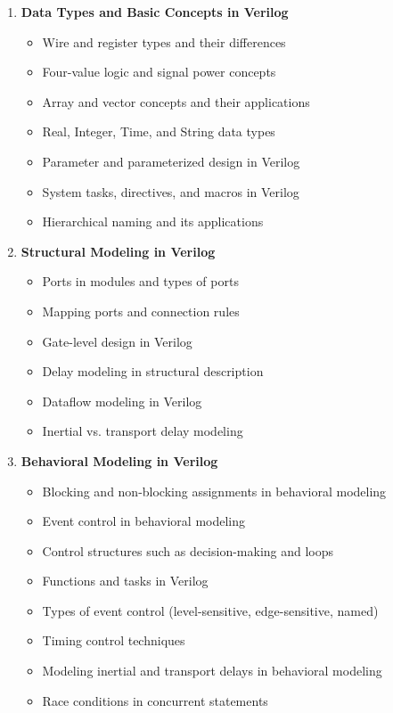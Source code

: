 \documentclass[12pt]{article}
\begin{document}
\begin{enumerate}
    \item \textbf{Data Types and Basic Concepts in Verilog}
        \begin{itemize}
            \item Wire and register types and their differences
            \item Four-value logic and signal power concepts
            \item Array and vector concepts and their applications
            \item Real, Integer, Time, and String data types
            \item Parameter and parameterized design in Verilog
            \item System tasks, directives, and macros in Verilog
            \item Hierarchical naming and its applications
        \end{itemize}
    
    \item \textbf{Structural Modeling in Verilog}
        \begin{itemize}
            \item Ports in modules and types of ports
            \item Mapping ports and connection rules
            \item Gate-level design in Verilog
            \item Delay modeling in structural description
            \item Dataflow modeling in Verilog
            \item Inertial vs. transport delay modeling
        \end{itemize}

    \item \textbf{Behavioral Modeling in Verilog}
        \begin{itemize}
            \item Blocking and non-blocking assignments in behavioral modeling
            \item Event control in behavioral modeling
            \item Control structures such as decision-making and loops
            \item Functions and tasks in Verilog
            \item Types of event control (level-sensitive, edge-sensitive, named)
            \item Timing control techniques
            \item Modeling inertial and transport delays in behavioral modeling
            \item Race conditions in concurrent statements
        \end{itemize}


\end{enumerate}
\end{document}

